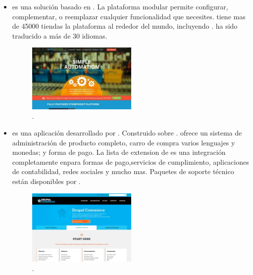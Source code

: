 \begin{itemize}
	\item \textbf{\nameSpreeCommerce} es una solución \ecommerce \openSourcePC  basado en \rubyonrails. La plataforma modular permite configurar, complementar, o reemplazar cualquier funcionalidad que necesites. \nameSpreeCommerce tiene mas de 45000 tiendas la plataforma al rededor del mundo, incluyendo \chipotle \cite{online_Chipotle}. \nameSpreeCommerce ha sido traducido a más de 30 idiomas.

	\begin{figure}[H]
		\centering
		\includegraphics[width=0.5\textwidth]{figuras/cap1/SpreeCommerceWebsite.jpg}
		\caption{\nameSpreeCommerce \websiteINT \cite{online_SpreeCommerce}.}
	\end{figure}

	\item \textbf{\nameDrupalCommerce} es una aplicación \ecommerce desarrollado por \commerceGuys. Construido sobre \drupalContManSys. \nameDrupalCommerce ofrece un sistema de administración de producto completo, carro de compra varios lenguajes y monedas; y forma de pago. La lista de extension de \nameDrupalCommerce es una integración completamente en\thirdParty para formas de pago,servicios de cumplimiento, aplicaciones de contabilidad, redes sociales y mucho mas. Paquetes de soporte técnico están disponibles por \commerceGuys.

	\begin{figure}[H]
		\centering
		\includegraphics[width=0.5\textwidth]{figuras/cap1/DrupalCommerceWebsite.jpg}
		\caption{\nameDrupalCommerce \websiteINT \cite{online_DrupalCommerce}.}
	\end{figure}


\end{itemize}
